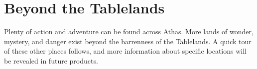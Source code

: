 \section{Beyond the Tablelands}
Plenty of action and adventure can be found across Athas. More lands of wonder, mystery, and danger exist beyond the barrenness of the Tablelands. A quick tour of these other places follows, and more information about specific locations will be revealed in future products.






